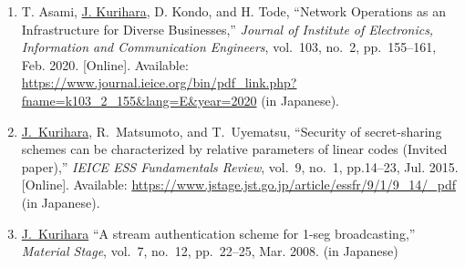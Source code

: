 \begin{enumerate}
 \item T. Asami, \underline{J. Kurihara}, D. Kondo, and H. Tode, ``Network Operations as an Infrastructure for Diverse Businesses,'' \textit{Journal of Institute of Electronics, Information and Communication Engineers}, vol.~103, no.~2, pp.~155--161, Feb. 2020. [Online]. Available: \url{https://www.journal.ieice.org/bin/pdf_link.php?fname=k103_2_155&lang=E&year=2020} (in Japanese).
 \item \underline{J.~Kurihara}, R.~Matsumoto, and T.~Uyematsu, ``Security of secret-sharing schemes can be characterized by relative parameters of linear codes (Invited paper),'' \textit{IEICE ESS Fundamentals Review}, vol.~9, no.~1, pp.14--23, Jul. 2015. [Online]. Available: \url{https://www.jstage.jst.go.jp/article/essfr/9/1/9_14/_pdf} (in Japanese).
 \item \underline{J.~Kurihara} ``A stream authentication scheme for 1-seg broadcasting,'' \textit{Material Stage}, vol.~7, no.~12, pp.~22--25, Mar. 2008. (in Japanese)
\end{enumerate}